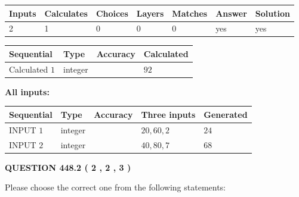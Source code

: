 \documentclass[12pt]{article}
\begin{document}
 
\noindent{}
 
 

 
   
   
   
   
\noindent\begin{tabular}{|l|l|l|l|l|l|l|}
 \hline
Inputs & Calculates & Choices & Layers & Matches & Answer & Solution \\ \hline
 2  & 
 1  & 
 0
  & 
 0  & 
 0  & 
  yes & 
  yes 
  \\ \hline
 \end{tabular}
   
   
   
   
\noindent{}
   
   
  
  
\noindent\begin{tabular}{|l|l|l|l|}
\hline
 Sequential & Type & Accuracy & Calculated \\ 
\hline
 
 
  Calculated $  1 $ & integer &  & 
  $ 92 $ 
 \\  \hline  
 \end{tabular}
   
   
   
   
\noindent\vspace{0.1in}\hspace{-0.08in} {\textbf{\Large{All inputs: }}}
   
   
  
  
\noindent\begin{tabular}{|l|l|l|l|l|}
\hline
 Sequential & Type & Accuracy & Three inputs & Generated \\ 
\hline
 
 
  INPUT $  1 $ & integer &  & $
 20
 , 
 60
 , 
 2
 $ & $ 24 $ 
 \\  \hline  
 
 
  INPUT $  2 $ & integer &  & $
 40
 , 
 80
 , 
 7
 $ & $ 68 $ 
 \\  \hline  
 \end{tabular}
   
   
  
\vspace{0.2in}
  
{\textbf{\Large{QUESTION
448.2 
 ( 2 , 2 , 3 )
}}}
  
  
Please choose the correct one from the following statements:
 
\end{document}
